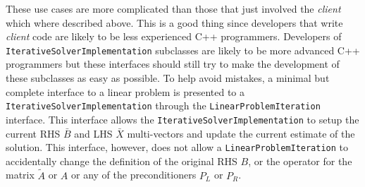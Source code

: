 \documentclass[pdf,ps2pdf,11pt]{SANDreport}
\begin{document}
These use cases are more complicated than those that just involved the
{}\textit{client} which where described above.  This is a good thing
since developers that write {}\textit{client} code are likely to be
less experienced C++ programmers.  Developers of
{}\texttt{Iterative\-Solver\-Implementation} subclasses are likely to
be more advanced C++ programmers but these interfaces should still try
to make the development of these subclasses as easy as possible.  To
help avoid mistakes, a minimal but complete interface to a linear
problem is presented to a {}\texttt{Iterative\-Solver\-Implementation}
through the {}\texttt{Linear\-Problem\-Iteration} interface.  This
interface allows the {}\texttt{Iterative\-Solver\-Implementation} to
setup the current RHS $\bar{B}$ and LHS $\bar{X}$ multi-vectors and
update the current estimate of the solution.  This interface, however,
does not allow a {}\texttt{Linear\-Problem\-Iteration} to accidentally
change the definition of the original RHS $B$, or the operator for the
matrix $\tilde{A}$ or $A$ or any of the preconditioners $P_L$ or
$P_R$.
\end{document}
